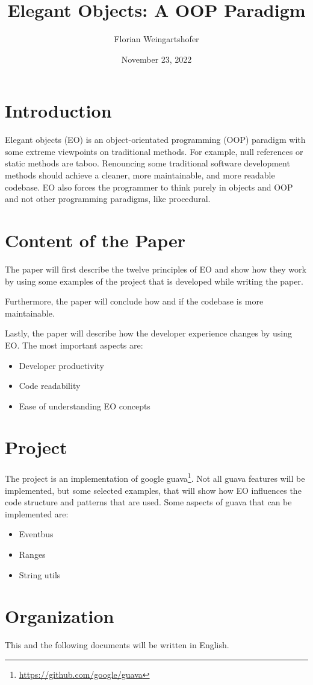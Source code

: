 \documentclass[11pt]{article}
\title{Elegant Objects: A OOP Paradigm}
\author{Florian Weingartshofer}
\date{November 23, 2022}
\begin{document}
    \maketitle


    \section{Introduction}\label{sec:motivation}
    Elegant objects (\gls{EO}) is an object-orientated programming (\gls{OOP}) paradigm with some extreme viewpoints on traditional methods.
    For example, null references or static methods are taboo.
    Renouncing some traditional software development methods should achieve a cleaner, more maintainable, and more readable codebase.
    \Gls{EO} also forces the programmer to think purely in objects and \gls{OOP} and not other programming paradigms, like procedural.


    \section{Content of the Paper}\label{sec:content-of-the-paper}
    The paper will first describe the twelve principles of \gls{EO} and show how they work by using some examples of the project that is developed while writing the paper.

    Furthermore, the paper will conclude how and if the codebase is more maintainable.

    Lastly, the paper will describe how the developer experience changes by using \gls{EO}.
    The most important aspects are:
    \begin{itemize}
        \item Developer productivity
        \item Code readability
        \item Ease of understanding \gls{EO} concepts
    \end{itemize}


    \section{Project}\label{sec:project}
    The project is an implementation of google guava\footnote{\url{https://github.com/google/guava}}.
    Not all guava features will be implemented, but some selected examples, that will show how \gls{EO} influences the code structure and patterns that are used.
    Some aspects of guava that can be implemented are:
    \begin{itemize}
        \item Eventbus
        \item Ranges
        \item String utils
    \end{itemize}


    \section{Organization}\label{sec:organization}
    This and the following documents will be written in English.

    \printglossary
\end{document}
